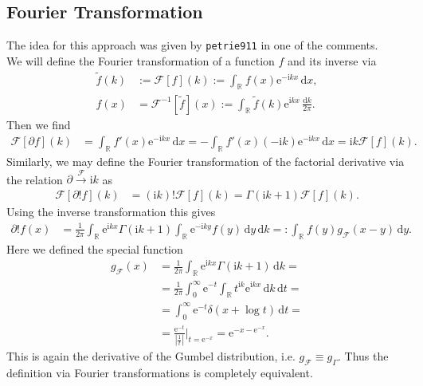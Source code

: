 \documentclass[english, parskip=full]{scrartcl}
\newcommand{\intx}{}
\newcommand{\intr}{}
\newcommand{\kla}{}
\newcommand{\klam}{}
\renewcommand{\i}{\text{i}}
\newcommand{\e}{\text{e}}
\begin{document}
\subsection{Fourier Transformation}
The idea for this approach was given by \texttt{petrie911} in one of the comments.\\
We will define the Fourier transformation of a function $f$ and its inverse via
\begin{align}
\tilde{f}(k) &:= \mathcal{F}[f](k) := \intr\int_{\mathbb{R}^{ }} f(x)\e^{-\i kx} \, \mathrm{d}x,\\
f(x) &= \mathcal{F}^{-1}[\tilde{f}](x) := \intr\int_{\mathbb{R}^{ }} \tilde{f}(k)\e^{\i kx} \, \frac{\mathrm{d}k}{2\pi}.
\end{align}
Then we find
\begin{align}
\mathcal{F}[\partial f](k) &= \int_{\mathbb{R}^{ }} f'(x) \e^{-\i kx} \, \mathrm{d}x = -\int_{\mathbb{R}^{ }} f'(x) (-\i k)\e^{-\i kx} \, \mathrm{d}x = \i k\mathcal{F}[f](k).
\end{align}
Similarly, we may define the Fourier transformation of the factorial derivative via the relation $\partial \overset{\mathcal{F}}{\longrightarrow} \i k$ as
\begin{align}
\mathcal{F}\klam\left[ \partial ! f \right](k) &= (\i k)! \mathcal{F}[f](k) = \Gamma (\i k + 1) \mathcal{F}[f](k).
\end{align}
Using the inverse transformation this gives
\begin{align}
\partial ! f(x) &= \frac{1}{2\pi} \intr\int_{\mathbb{R}^{ }} \e^{\i kx} \Gamma(\i k + 1) \intr\int_{\mathbb{R}^{ }} \e^{-\i ky} f(y) \, \mathrm{d}y\, \mathrm{d}k =: \int_{\mathbb{R}^{ }} f(y) g_\mathcal{F}(x - y) \, \mathrm{d}y.
\end{align}
Here we defined the special function
\begin{align}
g_\mathcal{F}(x) &= \frac{1}{2\pi} \intr\int_{\mathbb{R}^{ }} \e^{\i kx} \Gamma( \i k + 1) \, \mathrm{d}k = \\
&= \frac{1}{2\pi} \intx\int_{0}^{\infty} \e^{-t} \intx\int_{\mathbb{R}}^{} t^{\i k} \e^{\i kx} \, \mathrm{d}k \, \mathrm{d}t = \\
&= \intx\int_{0}^{\infty} \e^{-t} \delta \kla\left( x + \log t \right) \, \mathrm{d}t = \\
&= \frac{\e^{-t}}{\left\vert \frac{1}{t} \right\vert} \bigg\vert_{t = \e^{-x}} = \e^{-x - \e^{-x}}.
\end{align}
This is again the derivative of the Gumbel distribution, i.e. $g_\mathcal{F} \equiv g_\Gamma$.
Thus the definition via Fourier transformations is completely equivalent.
\end{document}
